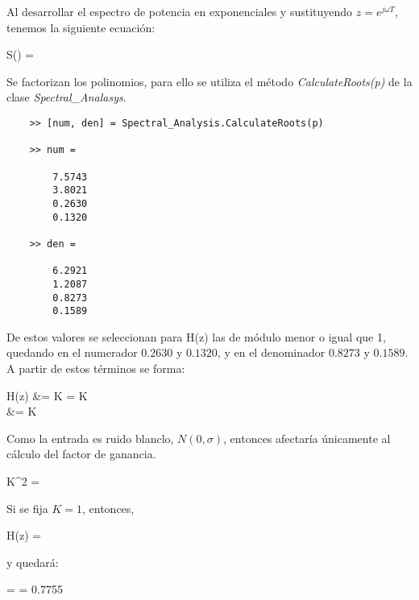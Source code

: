 \documentclass[a4paper, fontsize=11pt]{scrartcl} %
\numberwithin{equation}{section} %
\numberwithin{figure}{section} %
\numberwithin{table}{section} %
\newenvironment{myalign}{\par\nobreak\large\noindent\align}{\endalign} %
\begin{document}
	Al desarrollar el espectro de potencia en exponenciales y sustituyendo $z=e^{j\omega T}$, tenemos la siguiente ecuación:
	
	\begin{myalign}
		S(\omega) = 
	\end{myalign}
	
	Se factorizan los polinomios, para ello se utiliza el método \textit{CalculateRoots(p)} de la clase \textit{Spectral\_Analasys}.
	
	\begin{lstlisting}
	>> [num, den] = Spectral_Analysis.CalculateRoots(p)
	
	>> num =
	
		7.5743
		3.8021
		0.2630
		0.1320
		
	>> den =
	
		6.2921
		1.2087
		0.8273
		0.1589		
	\end{lstlisting}
	
	De estos valores se seleccionan para H(z) las de módulo menor o igual que 1, quedando en el numerador $0.2630$ y $0.1320$, y en el denominador $0.8273$ y $0.1589$. A partir de estos términos se forma:
	
	\begin{myalign}
		\begin{split}
			H(z) &= K = K \\
				 &= K  
		\end{split}
	\end{myalign}
	
	Como la entrada es ruido blanclo, $N(0,\sigma)$, entonces afectaría únicamente al cálculo del factor de ganancia.
	
	\begin{myalign}
		K^2 \sigma = 
	\end{myalign}
	
	Si se fija $K = 1$, entonces,
	
	\begin{myalign}
			H(z) =  
	\end{myalign}
	 
	y quedará:
	
	\begin{myalign}
		\sigma =  = 0.7755
	\end{myalign}
	
\end{document}
